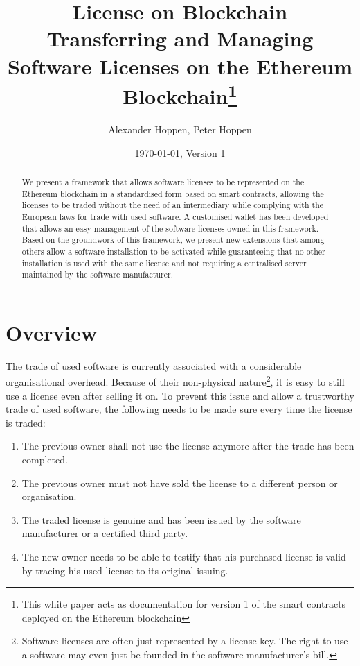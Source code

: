 \documentclass[a4paper]{article}
\title{License on Blockchain \\[5mm] \large Transferring and Managing Software Licenses on the Ethereum Blockchain\footnote{This white paper acts as documentation for version 1 of the smart contracts deployed on the Ethereum blockchain}}
\author{Alexander Hoppen, Peter Hoppen}
\date{\today, Version 1}
\begin{document}
\maketitle



\begin{abstract}
  We present a framework that allows software licenses to be represented on the Ethereum blockchain in a standardised form based on smart contracts, allowing the licenses to be traded without the need of an intermediary while complying with the European laws for trade with used software. A customised wallet has been developed that allows an easy management of the software licenses owned in this framework. Based on the groundwork of this framework, we present new extensions that among others allow a software installation to be activated while guaranteeing that no other installation is used with the same license and not requiring a centralised server maintained by the software manufacturer.
\end{abstract}

\section{Overview}

The trade of used software is currently associated with a considerable organisational overhead. Because of their non-physical nature\footnote{Software licenses are often just represented by a license key. The right to use a software may even just be founded in the software manufacturer's bill.}, it is easy to still use a license even after selling it on. To prevent this issue and allow a trustworthy trade of used software, the following needs to be made sure every time the license is traded:
\begin{enumerate}
  \item The previous owner shall not use the license anymore after the trade has been completed.
  \item The previous owner must not have sold the license to a different person or organisation.
  \item The traded license is genuine and has been issued by the software manufacturer or a certified third party.
  \item The new owner needs to be able to testify that his purchased license is valid by tracing his used license to its original issuing.
\end{enumerate}
\end{document}
